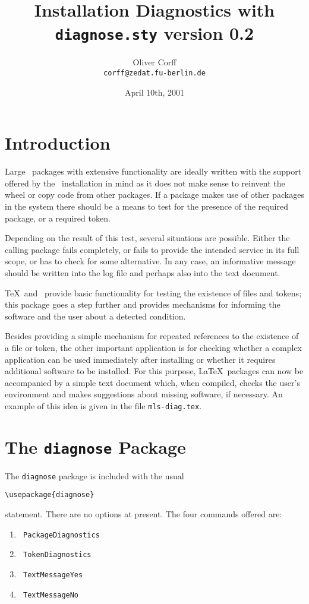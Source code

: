 \documentclass{ltxdoc}
\title{Installation Diagnostics with\\\texttt{diagnose.sty} version 0.2}
\author{Oliver Corff\\\texttt{corff@zedat.fu-berlin.de}}
\date{April 10th, 2001}
\begin{document}
\maketitle
\tableofcontents
\section{Introduction}

Large \LaTeXe\ packages with extensive functionality are ideally
written with the support offered by the \LaTeXe\ installation in
mind as it does not make sense to reinvent the wheel or copy code
from other packages. If a package makes use of other packages in
the system there should be a means to test for the presence of
the required package, or a required token.

Depending on the result of this test, several situations are
possible. Either the calling package fails completely, or fails
to provide the intended service in its full scope, or has to check
for some alternative. In any case, an informative message should
be written into the log file and perhaps also into  the text document.

\TeX\ and \LaTeXe\ provide basic functionality for testing the
existence of files and tokens; this package goes a step further
and provides mechanisms for informing the software and the user
about a detected condition.

Besides providing a simple mechanism for repeated references to
the existence of a file or token,
the other important application is for checking whether a 
complex application can be used immediately after installing or
whether it requires additional software to be installed. For this 
purpose, \LaTeX\ packages can now be accompanied by a simple text
document which, when compiled, checks the user's environment and
makes suggestions about missing software, if necessary. An example
of this idea is given in the file \texttt{mls-diag.tex}.

\section{The \texttt{diagnose} Package}

The \texttt{diagnose} package is included with the usual
\begin{verbatim}
\usepackage{diagnose}
\end{verbatim}
statement. There are no options at present.
The four commands offered are:
\begin{enumerate}
	\item \texttt{ PackageDiagnostics}
	\item \texttt{ TokenDiagnostics}
	\item \texttt{ TextMessageYes}
	\item \texttt{ TextMessageNo}
\end{enumerate}
\end{document}
